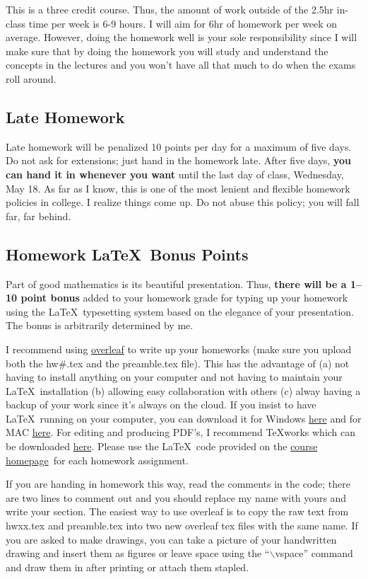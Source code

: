 \documentclass[12pt]{article}
\newcommand{\ingreen}[1]{\color{green}\textbf{#1} \color{black}}
\newcommand{\coursewebpage}{\href{https://github.com/kapelner/QC_Math_390.03-02_Spr_2016}{course homepage}}
\newcommand{\qu}[1]{``#1''}
\begin{document}
This is a three credit course. Thus, the amount of work outside of the 2.5hr in-class time per week is 6-9 hours. I will aim for 6hr of homework per week on average. However, doing the homework well is your sole responsibility since I will make sure that by doing the homework you will study and understand the concepts in the lectures and you won't have all that much to do when the exams roll around.

\subsection*{Late Homework}

Late homework will be penalized 10 points per day for a maximum of five days. Do not ask for extensions; just hand in the homework late. After five days, \textbf{you can hand it in whenever you want} until the last day of class, Wednesday, May 18. As far as I know, this is one of the most lenient and flexible homework policies in college. I realize things come up. Do not abuse this policy; you will fall far, far behind.

\subsection*{Homework \LaTeX~Bonus Points}

Part of good mathematics is its beautiful presentation. Thus, \ingreen{there will be a 1--10 point bonus} added to your homework grade  for typing up your homework using the \LaTeX ~typesetting system based on the elegance of your presentation. The bonus is arbitrarily determined by me.

I recommend using \href{http://overleaf.com}{overleaf} to write up your homeworks (make sure you upload both the hw\#.tex and the preamble.tex file). This has the advantage of (a) not having to install anything on your computer and not having to maintain your \LaTeX ~installation (b) allowing easy collaboration with others (c) alway having a backup of your work since it's always on the cloud. If you insist to have \LaTeX ~running on your computer, you can download it for Windows \href{http://www.miktex.org/download}{here} and for MAC \href{http://www.tug.org/mactex/}{here}. For editing and producing PDF's, I recommend \TeX works which can be downloaded \href{http://www.tug.org/texworks/#Getting_TeXworks}{here}. Please use the \LaTeX ~code provided on the \coursewebpage ~for each homework assignment. 

If you are handing in homework this way, read the comments in the code; there are two lines to comment out and you should replace my name with yours and write your section. The easiest way to use overleaf is to copy the raw text from hwxx.tex and preamble.tex into two new overleaf tex files with the same name. If you are asked to make drawings, you can take a picture of your handwritten drawing and insert them as figures or leave space using the \qu{$\backslash$vspace} command and draw them in after printing or attach them stapled.
\end{document}
